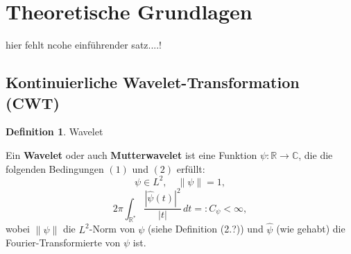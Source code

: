 \documentclass[a4paper,11pt,bibliography=totoc,listof=totoc,headinclude=true,cleardoublepage=empty,oneside]{scrbook}
\newcommand{\norm}[1]{\left\lVert #1 \right\rVert}
\theoremstyle{definition}
\newtheorem{definition}[theorem]{Definition}
\theoremstyle{remark}
\begin{document}


\section{Theoretische Grundlagen}
 hier fehlt ncohe einführender satz....!
\subsection{Kontinuierliche Wavelet-Transformation (CWT)}

\begin{definition}{Wavelet} \cite[S.~54, Section~3.1]{blatterWaveletsEinfuhrung2003}

  Ein \textbf{Wavelet} oder auch \textbf{Mutterwavelet} ist eine Funktion
  $\psi: \mathbb{R} \to \mathbb{C}$, die die folgenden Bedingungen $(1)$ und $(2)$ erfüllt:
  \[
    \psi \in L^2, \quad \norm{\psi} = 1, \tag{1}
  \]
  \[
    2\pi \int_{\mathbb{R}^*} \frac{|\hat\psi(t)|^2}{|t|} \, dt =: C_\psi < \infty, \tag{2}
  \]
  wobei $\norm{\psi}$ die $L^2$-Norm von $\psi$ (siehe Definition (2.?)) und $\hat\psi$ (wie
  gehabt) die Fourier-Transformierte von $\psi$ ist.

\end{definition}
\end{document}
